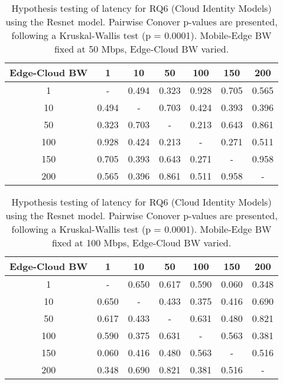 \begin{table}[H]
\caption{Hypothesis testing of latency for RQ6 (Cloud Identity Models) using the Resnet model. Pairwise Conover p-values are presented, following a Kruskal-Wallis test (p = 0.0001). Mobile-Edge BW fixed at 50 Mbps, Edge-Cloud BW varied.}
\centering
\begin{tabular}{c|cccccc}
Edge-Cloud BW & 1 & 10 & 50 & 100 & 150 & 200 \\
\hline
1 & - & 0.494 & 0.323 & 0.928 & 0.705 & 0.565 \\
10 & 0.494 & - & 0.703 & 0.424 & 0.393 & 0.396 \\
50 & 0.323 & 0.703 & - & 0.213 & 0.643 & 0.861 \\
100 & 0.928 & 0.424 & 0.213 & - & 0.271 & 0.511 \\
150 & 0.705 & 0.393 & 0.643 & 0.271 & - & 0.958 \\
200 & 0.565 & 0.396 & 0.861 & 0.511 & 0.958 & - \\
\end{tabular}
\end{table}

\begin{table}[H]
\caption{Hypothesis testing of latency for RQ6 (Cloud Identity Models) using the Resnet model. Pairwise Conover p-values are presented, following a Kruskal-Wallis test (p = 0.0001). Mobile-Edge BW fixed at 100 Mbps, Edge-Cloud BW varied.}
\centering
\begin{tabular}{c|cccccc}
Edge-Cloud BW & 1 & 10 & 50 & 100 & 150 & 200 \\
\hline
1 & - & 0.650 & 0.617 & 0.590 & 0.060 & 0.348 \\
10 & 0.650 & - & 0.433 & 0.375 & 0.416 & 0.690 \\
50 & 0.617 & 0.433 & - & 0.631 & 0.480 & 0.821 \\
100 & 0.590 & 0.375 & 0.631 & - & 0.563 & 0.381 \\
150 & 0.060 & 0.416 & 0.480 & 0.563 & - & 0.516 \\
200 & 0.348 & 0.690 & 0.821 & 0.381 & 0.516 & - \\
\end{tabular}
\end{table}

